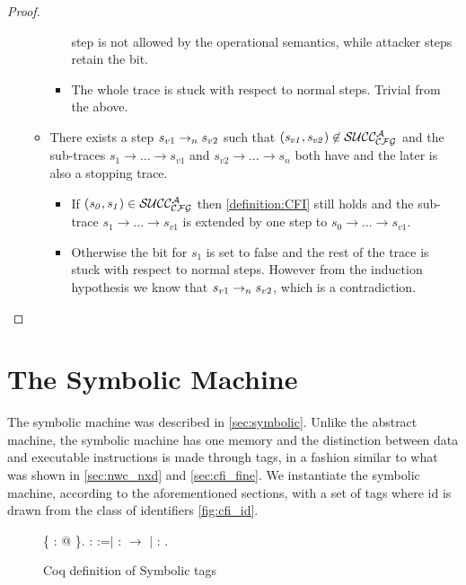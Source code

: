\begin{proof}
\begin{itemize}
\begin{itemize}
\begin{itemize}
           step is not allowed by the operational semantics,
           while attacker steps retain the \ok bit.
         \item The whole trace is stuck with respect to normal steps.
           Trivial from the above.
       \end{itemize}
     \item There exists a step $s_{v1}\to_ns_{v2}$ such that
       $(\mathit{s_{v1}},\mathit{s_{v2}}) \not \in \mathcal{SUCC_\mathcal{CFG}^{A}}$ and
       the sub-traces $s_1 \to \ldots \to s_{v1}$ and
       $s_{v2} \to \ldots \to s_n$ both have \CFI and the later
       is also a stopping trace. 
       \begin{itemize}
         \item If $(\mathit{s_0},\mathit{s_1}) \in \mathcal{SUCC_\mathcal{CFG}^{A}}$ then
           \ref{definition:CFI} still holds and the sub-trace $s_1 \to \ldots 
           \to s_{v1}$ is extended by one step to $s_0 \to \ldots \to s_{v1}$.
         \item Otherwise the \ok bit for $s_1$ is set to false and the
           rest of the trace is stuck with respect to normal steps. However from
           the induction hypothesis we know that $s_{v1}\to_ns_{v2}$, which
           is a contradiction.
         \end{itemize}
       \end{itemize}
  \end{itemize}
\end{proof}

\section{The Symbolic  Machine}\label{sec:symbolic_cfi}

The symbolic machine was described in \ref{sec:symbolic}. Unlike the
abstract machine, the symbolic machine has one memory and the
distinction between data and executable instructions is made through
tags, in a fashion similar to what was shown in \ref{sec:nwc_nxd} and
\ref{sec:cfi_fine}. We instantiate the symbolic machine, according to
the aforementioned sections, with a set of tags
 where id is drawn from the
class of identifiers \ref{fig:cfi_id}.

\begin{figure}[!htpb]
   \{ : @
  \}.\coqdoceol \coqdocemptyline \coqdocnoindent
    : 
  :=\coqdoceol \coqdocnoindent \ensuremath{|}  :
    \ensuremath{\rightarrow}
  \coqdoceol \coqdocnoindent \ensuremath{|}
   : .\coqdoceol
\caption{Coq definition of Symbolic tags}
\end{figure}

